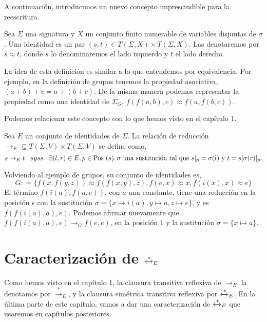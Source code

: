 A continuación, introducimos un nuevo concepto imprescindible para la reescritura.

\begin{defi}
  Sea $\Sigma$ una signatura y $X$ un conjunto finito numerable de variables
  disjuntas de $\sigma$. Una identidad es un par
  $(s,t) \in T(\Sigma, X) \times T(\Sigma, X)$. Las denotaremos por
  $s \approx t$, donde $s$ lo denominaremos el lado izquierdo y $t$ el lado
  derecho.
\end{defi} 

La idea de esta definición es similar a lo que entendemos por
equivalencia. Por ejemplo, en la definición de grupos tenemos la
propiedad asociativa, $(a+b)+c =a+(b+c)$. De la misma manera podemos
representar la propiedad como una identidad de $\Sigma_G$,
$f(f(a,b),c) \approx f(a,f(b,c))$.

Podemos relacionar este concepto con lo que hemos visto en el capítulo 1.

\begin{defi}
  Sea $E$ un conjunto de identidades de $\Sigma$. La relación de
  reducción $\rightarrow_E \subseteq T(\Sigma, V) \times T(\Sigma, V)$
  se define como,
  \[
    s \rightarrow_E t \hspace{.3cm} syss \hspace{.3cm} \exists(l,r)
    \in E, p \in \mbox{Pos } (s), \sigma \text{ una sustitución tal que } s|_p = \sigma(l) \text{ y } t=
    s[\sigma(r)]_p.
  \]
\end{defi}

Volviendo al ejemplo de grupos, su conjunto de identidades es,
\[
  G : = \{f(x,f(y,z)) \approx f(f(x,y),z), f(e,x) \approx x, f(i(x),x)
  \approx e \}
\]
El término $f(i(a), f(a,e))$, con $a$ una constante, tiene una
reducción en la posición $\epsilon$ con la sustitución
$\sigma = \{x \mapsto i(a), y \mapsto a, z \mapsto e \}$, y es
$f(f(i(a),a),e)$. Podemos afirmar nuevamente que
$f(f(i(a),a),e) \rightarrow_G f(e,e)$, en la posición $1$ y la
sustitución $\sigma = \{x \mapsto a \}$.



\section{Caracterización de $\xleftrightarrow{*}_E$}

Como hemos visto en el capítulo 1, la clausura transitiva reflexiva de
$\rightarrow_E$ la denotamos por $\xrightarrow{*}_E$, y la clausura
simétrica transitiva reflexiva por $\xleftrightarrow{*}_E$. En la
última parte de este capítulo, vamos a dar una caracterización de
$\xleftrightarrow{*}_E$ que usaremos en capítulos posteriores.

